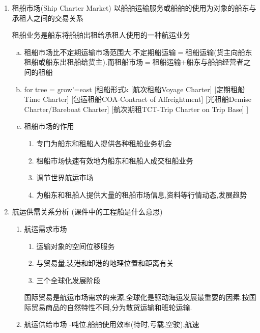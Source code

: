 \documentclass[UTF8,a4paper]{ctexart}
\begin{document}
\begin{enumerate}[1)]
		\item 租船市场(Ship Charter Market) 以船舶运输服务或船舶的使用为对象的船东与承租人之间的交易关系
		
		租船业务是船东将船舶出租给承租人使用的一种航运业务
		
			\begin{enumerate}[a)]
				\item 租船市场比不定期运输市场范围大.不定期船运输$=$租船运输(货主向船东租船或船东出租船给货主).而租船市场$=$租船运输$+$船东与船舶经营者之间的租船
				\item 
					\begin{forest}
						for tree = {grow'=east}
						[租船形式k
							[航次租船Voyage Charter]
							[定期租船Time Charter]
							[包运租船COA-Contract of Affreightment]
							[光租船Demise Charter/Bareboat Charter]
							[航次期租TCT-Trip Charter on Trip Base]
							]
					\end{forest}
				\item 租船市场的作用
					\begin{enumerate}[.]
						\item 专门为船东和租船人提供各种租船业务机会
						\item 租船市场快速有效地为船东和租船人成交租船业务
						\item 调节世界航运市场
						\item 为船东和租船人提供大量的租船市场信息,资料等行情动态,发展趋势
					\end{enumerate}
			\end{enumerate}
		
		\item 航运供需关系分析 (课件中的工程船是什么意思)
		\begin{enumerate}[.]
			\item 航运需求市场
				\begin{enumerate}[-]
					\item 运输对象的空间位移服务
					\item 与贸易量,装港和卸港的地理位置和距离有关
					\item 三个全球化发展阶段
				\end{enumerate}
			国际贸易是航运市场需求的来源,全球化是驱动海运发展最重要的因素.按国际贸易商品的自然特性不同,分为散货运输和班轮运输.
			\item 航运供给市场
				-吨位,船舶使用效率(待时,亏载,空驶),航速
				

\end{enumerate}
\end{enumerate}
\end{document}
